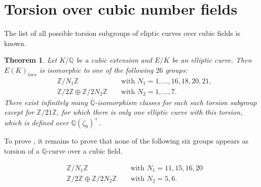 \documentclass[10pt,leqno]{amsart}
\newcommand{\Z}{\mathbb{Z}}
\newcommand{\Q}{\mathbb{Q}}
\newtheorem{theorem}{Theorem}[]
\theoremstyle{definition}
\theoremstyle{remark}
\numberwithin{theorem}{section}
\begin{document}
\section{Torsion over cubic number fields}\label{cubiccase}

The list of all possible torsion subgroups of eliptic curves over cubic fields is known.

\begin{theorem}\label{cubictorsion}\cite[Theorem A]{cubictorsion}
        Let $K/\Q$ be a cubic extension and $E/K$ be an elliptic curve. Then $E(K)_{tors}$ is isomorphic to one of the following $26$ groups:
        \begin{align*}
            &\Z/N_1\Z && \text{ with } N_1=1,\ldots,16,18,20,21, \\
            &\Z/2\Z\oplus \Z/2N_2\Z && \text{ with } N_2=1,\ldots, 7.
        \end{align*}
        There exist infinitely many $\overline{\Q}$-isomorphism classes for each such torsion subgroup except for $\Z/21\Z$, for which there is only one elliptic curve with this torsion, which is defined over $\Q(\zeta_9)^+$.
\end{theorem}

To prove , it remains to prove that none of the following six groups appears as torsion of a $\Q$-curve over a cubic field.

 \begin{align*}
            &\Z/N_1\Z && \text{ with } N_1=11,15,16,20 \\
            &\Z/2\Z\oplus \Z/2N_2\Z && \text{ with } N_2=5,6.
\end{align*}
\end{document}
